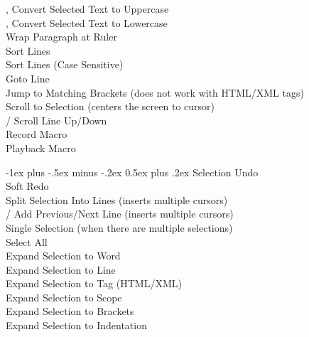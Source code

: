 \documentclass[10pt,landscape]{article}
\makeatletter
\renewcommand{\section}{\@startsection{section}{1}{0mm}%
                                {-1ex plus -.5ex minus -.2ex}%
                                {0.5ex plus .2ex}%
                                {\normalfont\large\bfseries}}
\makeatother
\begin{document}
\begin{multicols}{3}
\keys{\cmd} , \keys{\cmd}  Convert Selected Text to Uppercase \\
\keys{\cmd} , \keys{\cmd}  Convert Selected Text to Lowercase \\
\keys{\cmd} \keys{\Alt}  Wrap Paragraph at Ruler \\
 Sort Lines \\
\keys{\ctrl}  Sort Lines (Case Sensitive) \\
\keys{\ctrl}  Goto Line \\
\keys{\ctrl}  Jump to Matching Brackets (does not work with HTML/XML tags) \\
\keys{\ctrl}  Scroll to Selection (centers the screen to cursor) \\
\keys{\ctrl} \keys{\Alt} \keys{\arrowkeyup}/\keys{\arrowkeydown} Scroll Line Up/Down \\
\keys{\ctrl}  Record Macro \\
\keys{\ctrl} \keys{\shift}  Playback Macro

\section{Selection}
\keys{\cmd}  Undo \\
\keys{\cmd} \keys{\shift}  Soft Redo \\
\keys{\cmd} \keys{\shift}  Split Selection Into Lines (inserts multiple cursors) \\
\keys{\ctrl} \keys{\shift} \keys{\arrowkeyup}/\keys{\arrowkeydown} Add Previous/Next Line (inserts multiple cursors) \\
\keys{\esc} Single Selection (when there are multiple selections) \\
\keys{\cmd}  Select All \\
\keys{\cmd}  Expand Selection to Word \\
\keys{\cmd}  Expand Selection to Line \\
\keys{\cmd} \keys{\shift}  Expand Selection to Tag (HTML/XML) \\
\keys{\cmd} \keys{\shift} \keys{\space} Expand Selection to Scope \\
\keys{\ctrl} \keys{\shift}  Expand Selection to Brackets \\
\keys{\cmd} \keys{\shift}  Expand Selection to Indentation \\


\end{multicols}
\end{document}

